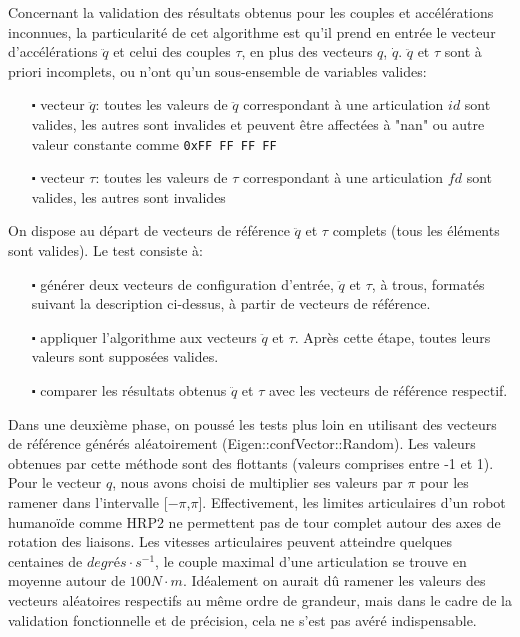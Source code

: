 \documentclass{report}
\begin{document}
Concernant la validation des résultats obtenus pour les couples et accélérations inconnues, la particularité de cet algorithme est qu'il prend en entrée le vecteur d'accélérations $\ddot{q}$ et celui des couples $\tau$, en plus des vecteurs $q$, $\dot{q}$. $\ddot{q}$ et $\tau$ sont à priori incomplets, ou n'ont qu'un sous-ensemble de variables valides:
\begin{itemize}
\item[$\centerdot$ vecteur $\ddot{q}$:] toutes les valeurs de $\ddot{q}$ correspondant à une articulation $id$ sont valides, les autres sont invalides et peuvent être affectées à "nan" ou autre valeur constante comme \verb;0xFF FF FF FF;
\item[$\centerdot$ vecteur $\tau$:] toutes les valeurs de $\tau$ correspondant à une articulation $fd$ sont valides, les autres sont invalides
\end{itemize}
On dispose au départ de vecteurs de référence $\ddot{q}$ et $\tau$ complets (tous les éléments sont valides). Le test consiste à:
\begin{itemize}
\item[$\centerdot$] générer deux vecteurs de configuration d'entrée, $\ddot{q}$ et $\tau$, à trous, \cad formatés suivant la description ci-dessus, à partir de vecteurs de référence.
\item[$\centerdot$] appliquer l'algorithme aux vecteurs $\ddot{q}$ et $\tau$. Après cette étape, toutes leurs valeurs sont supposées valides.
\item[$\centerdot$] comparer les résultats obtenus $\ddot{q}$ et $\tau$ avec les vecteurs de référence respectif.
\end{itemize}

Dans une deuxième phase, on poussé les tests plus loin en utilisant des vecteurs de référence générés aléatoirement (Eigen::confVector::Random). Les valeurs obtenues par cette méthode sont des flottants (valeurs comprises entre -1 et 1). Pour le vecteur $q$, nous avons choisi de multiplier ses valeurs par $\pi$ pour les ramener dans l'intervalle [$-\pi$,$\pi$]. Effectivement, les limites articulaires d'un robot humanoïde comme HRP2 ne permettent pas de tour complet autour des axes de rotation des liaisons. Les vitesses articulaires peuvent atteindre quelques centaines de $degrés \cdot s^{-1}$, le couple maximal d'une articulation se trouve en moyenne autour de $100 N \cdot m$. Idéalement on aurait dû ramener les valeurs des vecteurs aléatoires respectifs au même ordre de grandeur, mais dans le cadre de la validation fonctionnelle et de précision, cela ne s'est pas avéré indispensable.
\end{document}
